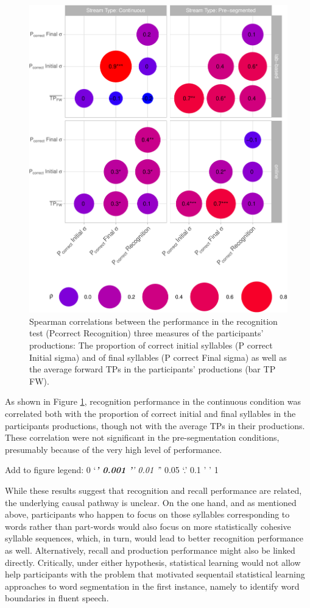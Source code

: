 \documentclass[
]{article}
\begin{document}
\begin{figure}

{\centering \includegraphics[width=0.8\linewidth]{segmentation_recall_combined_for_revision3_files/figure-latex/correlation-recognition-vs-position-plot-1} 

}

\caption{Spearman correlations between the performance in the recognition test (P{correct} Recognition) three measures of the participants' productions: The proportion of correct initial syllables (P {correct} Initial sigma) and of final syllables (P {correct} Final sigma) as well as the average forward TPs in the participants' productions (bar {TP {FW}}).}\label{fig:correlation-recognition-vs-position-plot}
\end{figure}

As shown in Figure \ref{fig:correlation-recognition-vs-position-plot},
recognition performance in the continuous condition was correlated both
with the proportion of correct initial and final syllables in the
participants productions, though not with the average TPs in their
productions. These correlation were not significant in the
pre-segmentation conditions, presumably because of the very high level
of performance.

Add to figure legend: 0 `\emph{\textbf{' 0.001 '}' 0.01 '}' 0.05 `.' 0.1
' ' 1

While these results suggest that recognition and recall performance are
related, the underlying causal pathway is unclear. On the one hand, and
as mentioned above, participants who happen to focus on those syllables
corresponding to words rather than part-words would also focus on more
statistically cohesive syllable sequences, which, in turn, would lead to
better recognition performance as well. Alternatively, recall and
production performance might also be linked directly. Critically, under
either hypothesis, statistical learning would not allow help
participants with the problem that motivated sequentail statistical
learning approaches to word segmentation in the first instance, namely
to identify word boundaries in fluent speech.
\end{document}
